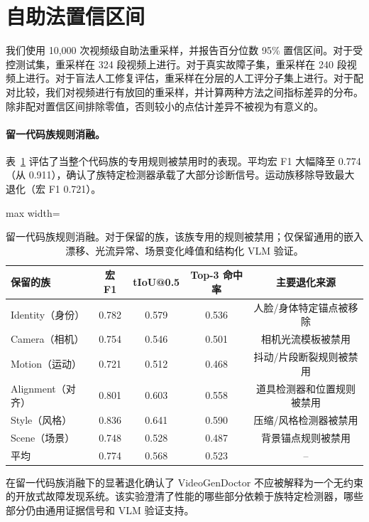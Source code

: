 \documentclass{article}
\begin{document}
\section{自助法置信区间}
\label{app:bootstrap}
我们使用 10,000 次视频级自助法重采样，并报告百分位数 95\% 置信区间。对于受控测试集，重采样在 324 段视频上进行。对于真实故障子集，重采样在 240 段视频上进行。对于盲法人工修复评估，重采样在分层的人工评分子集上进行。对于配对比较，我们对视频进行有放回的重采样，并计算两种方法之间指标差异的分布。除非配对置信区间排除零值，否则较小的点估计差异不被视为有意义的。

\begin{table}[t]
\centering\scriptsize
\caption{留一代码族规则消融。对于保留的族，该族专用的规则被禁用；仅保留通用的嵌入漂移、光流异常、场景变化峰值和结构化 VLM 验证。}
\paragraph{留一代码族规则消融。}
表~\ref{tab:leave_one_code_family} 评估了当整个代码族的专用规则被禁用时的表现。平均宏 F1 大幅降至 0.774（从 0.911），确认了族特定检测器承载了大部分诊断信号。运动族移除导致最大退化（宏 F1 0.721）。

\label{tab:leave_one_code_family}
\begin{adjustbox}{max width=\textwidth}
\begin{tabular}{lcccc}
\toprule
保留的族 & 宏 F1 & tIoU@0.5 & Top-3 命中率 & 主要退化来源 \\
\midrule
Identity（身份） & 0.782 & 0.579 & 0.536 & 人脸/身体特定锚点被移除 \\
Camera（相机） & 0.754 & 0.546 & 0.501 & 相机光流模板被禁用 \\
Motion（运动） & 0.721 & 0.512 & 0.468 & 抖动/片段断裂规则被禁用 \\
Alignment（对齐） & 0.801 & 0.603 & 0.558 & 道具检测器和位置规则被禁用 \\
Style（风格） & 0.836 & 0.641 & 0.590 & 压缩/风格检测器被禁用 \\
Scene（场景） & 0.748 & 0.528 & 0.487 & 背景锚点规则被禁用 \\
\midrule
平均 & 0.774 & 0.568 & 0.523 & -- \\
\bottomrule
\end{tabular}
\end{adjustbox}
\end{table}

在留一代码族消融下的显著退化确认了 VideoGenDoctor 不应被解释为一个无约束的开放式故障发现系统。该实验澄清了性能的哪些部分依赖于族特定检测器，哪些部分仍由通用证据信号和 VLM 验证支持。
\end{document}
